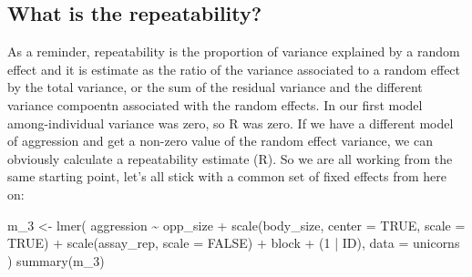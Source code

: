 \documentclass[
  12pt,
]{book}
\newenvironment{Shaded}{\begin{snugshade}}{\end{snugshade}}
\newcommand{\AttributeTok}[1]{\textcolor[rgb]{0.77,0.63,0.00}{#1}}
\newcommand{\ConstantTok}[1]{\textcolor[rgb]{0.00,0.00,0.00}{#1}}
\newcommand{\DecValTok}[1]{\textcolor[rgb]{0.00,0.00,0.81}{#1}}
\newcommand{\FunctionTok}[1]{\textcolor[rgb]{0.00,0.00,0.00}{#1}}
\newcommand{\NormalTok}[1]{#1}
\newcommand{\OtherTok}[1]{\textcolor[rgb]{0.56,0.35,0.01}{#1}}
\newcommand{\SpecialCharTok}[1]{\textcolor[rgb]{0.00,0.00,0.00}{#1}}
\begin{document}
\hypertarget{what-is-the-repeatability}{%
\subsection{What is the repeatability?}\label{what-is-the-repeatability}}

As a reminder, repeatability is the proportion of variance explained by a random effect and it is estimate as the ratio of the variance associated to a random effect by the total variance, or the sum of the residual variance and the different variance compoentn associated with the random effects.
In our first model among-individual variance was zero, so R was zero. If we have a different model of aggression and get a non-zero value of the random effect variance, we can obviously calculate a repeatability estimate (R). So we are all working from the same starting point, let's all stick with a common set of fixed effects from here on:

\begin{Shaded}
\begin{Highlighting}[]
\NormalTok{m\_3 }\OtherTok{\textless{}{-}} \FunctionTok{lmer}\NormalTok{(}
\NormalTok{  aggression }\SpecialCharTok{\textasciitilde{}}\NormalTok{ opp\_size }\SpecialCharTok{+} \FunctionTok{scale}\NormalTok{(body\_size, }\AttributeTok{center =} \ConstantTok{TRUE}\NormalTok{, }\AttributeTok{scale =} \ConstantTok{TRUE}\NormalTok{)}
    \SpecialCharTok{+} \FunctionTok{scale}\NormalTok{(assay\_rep, }\AttributeTok{scale =} \ConstantTok{FALSE}\NormalTok{) }\SpecialCharTok{+}\NormalTok{ block}
    \SpecialCharTok{+}\NormalTok{ (}\DecValTok{1} \SpecialCharTok{|}\NormalTok{ ID),}
  \AttributeTok{data =}\NormalTok{ unicorns}
\NormalTok{)}
\FunctionTok{summary}\NormalTok{(m\_3)}
\end{Highlighting}
\end{Shaded}
\end{document}
